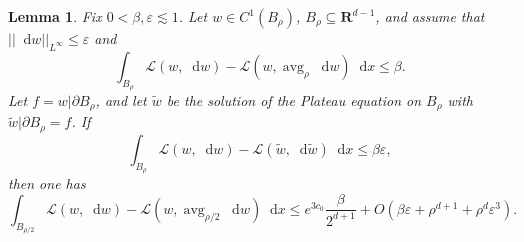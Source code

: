 \documentclass[reqno,10pt]{amsart}
\newcommand{\RR}{\mathbf{R}}
\DeclareMathOperator{\avg}{avg}
\newcommand*\dif{\mathop{}\!\mathrm{d}}
\newcommand{\Lagrange}{\mathscr L}
\newtheorem{lemma}[theorem]{Lemma}
\theoremstyle{definition}
\numberwithin{equation}{section}
\begin{document}
\begin{lemma}\label{bootstrap 2}
Fix $0 < \beta, \varepsilon \lesssim 1$.
Let $w \in C^1(B_\rho)$, $B_\rho \subseteq \RR^{d - 1}$, and assume that $||\dif w||_{L^\infty} \leq \varepsilon$ and
\begin{equation}\label{dGL Laplace 1}
\int_{B_\rho} \Lagrange(w, \dif w) - \Lagrange(w, \avg_\rho \dif w) \dif x \leq \beta.
\end{equation}
Let $f = w|\partial B_\rho$, and let $\tilde w$ be the solution of the Plateau equation on $B_\rho$ with $\tilde w|\partial B_\rho = f$.
If
\begin{equation}\label{dGL Laplace 2}
\int_{B_\rho} \Lagrange(w, \dif w) - \Lagrange(\tilde w, \dif \tilde w) \dif x \leq \beta\varepsilon,
\end{equation}
then one has
\begin{equation}\label{dGL Laplace concl}
\int_{B_{\rho/2}} \Lagrange(w, \dif w) - \Lagrange(w, \avg_{\rho/2} \dif w) \dif x \leq e^{3c_0}\frac{\beta}{2^{d + 1}} + O(\beta \varepsilon + \rho^{d + 1} + \rho^d \varepsilon^3).
\end{equation}
\end{lemma}
\end{document}

